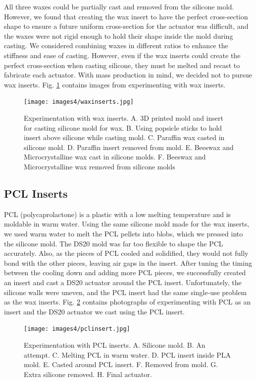 All three waxes could be partially cast and removed from the silicone mold. However, we found that creating the wax insert to have the perfect cross-section shape to ensure a future uniform cross-section for the actuator was difficult, and the waxes were not rigid enough to hold their shape inside the mold during casting. We considered combining waxes in different ratios to enhance the stiffness and ease of casting. However, even if the wax inserts could create the perfect cross-section when casting silicone, they must be melted and recast to fabricate each actuator. With mass production in mind, we decided not to pursue wax inserts. Fig. \ref{fig:waxinserts} contains images from experimenting with wax inserts. 

\begin{figure}[ht]
    \centering
    \texttt{[image: images4/waxinserts.jpg]}
    \caption{Experimentation with wax inserts. A. 3D printed mold and insert for casting silicone mold for wax. B. Using popsicle sticks to hold insert above silicone while casting mold. C. Paraffin wax casted in silicone mold. D. Paraffin insert removed from mold. E. Beeswax and Microcrystalline wax cast in silicone molds. F. Beeswax and Microcrystalline wax removed from silicone molds}
    \label{fig:waxinserts}
\end{figure}

\clearpage
\subsection{PCL Inserts}
PCL (polycaprolactone) is a plastic with a low melting temperature and is moldable in warm water. Using the same silicone mold made for the wax inserts, we used warm water to melt the PCL pellets into blobs, which we pressed into the silicone mold. The DS20 mold was far too flexible to shape the PCL accurately. Also, as the pieces of PCL cooled and solidified, they would not fully bond with the other pieces, leaving air gaps in the insert. After tuning the timing between the cooling down and adding more PCL pieces, we successfully created an insert and cast a DS20 actuator around the PCL insert. Unfortunately, the silicone walls were uneven, and the PCL insert had the same single-use problem as the wax inserts. Fig. \ref{fig:pclinsert} contains photographs of experimenting with PCL as an insert and the DS20 actuator we cast using the PCL insert.

\begin{figure}[ht]
    \centering
    \texttt{[image: images4/pclinsert.jpg]}
    \caption{Experimentation with PCL inserts. A. Silicone mold. B. An attempt. C. Melting PCL in warm water. D. PCL insert inside PLA mold. E. Casted around PCL insert. F. Removed from mold. G. Extra silicone removed. H. Final actuator.}
    \label{fig:pclinsert}
\end{figure}

